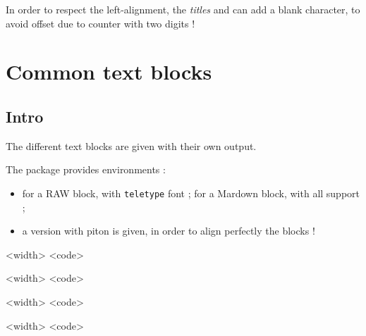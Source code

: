 \documentclass[english,11pt,a4paper]{article}
\begin{document}
In order to respect the left-alignment, the \textit{titles}  and  can add a blank character, to avoid offset due to counter with two digits !

\pagebreak

\section{Common text blocks}

\subsection{Intro}

The different text blocks are given with their own output.

The package provides environments :

\begin{itemize}
	\item for a \textsf{RAW} block, with \texttt{teletype} font ; for a \textsf{Mardown} block, with all  support ;
	\item a version with \textsf{piton} is given, in order to align perfectly the blocks !
\end{itemize}

\begin{codehigh}[language=latex/latex2,style/main=cyan!10,style/code=cyan!10]
\begin{NotebookRaw}{<width>}
<code>
\end{NotebookRaw}
\end{codehigh}

\begin{codehigh}[language=latex/latex2,style/main=cyan!10,style/code=cyan!10]
\begin{NotebookMarkdown}{<width>}
<code>
\end{NotebookMarkdown}
\end{codehigh}

\begin{codehigh}[language=latex/latex2,style/main=cyan!10,style/code=cyan!10]
\begin{NotebookPitonRaw}{<width>}
<code>
\end{NotebookPitonRaw}
\end{codehigh}

\begin{codehigh}[language=latex/latex2,style/main=cyan!10,style/code=cyan!10]
\begin{NotebookPitonMarkdown}{<width>}
<code>
\end{NotebookPitonMarkdown}
\end{codehigh}
\end{document}
